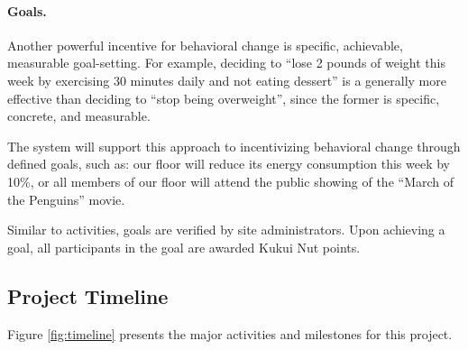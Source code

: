 \documentclass[11pt]{article}
\begin{document}
\paragraph{Goals.}  Another powerful incentive
for behavioral change is specific, achievable, measurable goal-setting.
For example, deciding to ``lose 2 pounds of weight this week by exercising
30 minutes daily and not eating dessert'' is a generally more effective
than deciding to ``stop being overweight'', since the former is specific,
concrete, and measurable.  

The system will support this approach to incentivizing behavioral change
through defined goals, such as: our floor will reduce its energy
consumption this week by 10\%, or all members of our floor will attend the
public showing of the ``March of the Penguins'' movie.  

Similar to activities, goals are verified by site administrators.  Upon
achieving a goal, all participants in the goal are awarded Kukui Nut
points.  


\subsection{Project Timeline}

Figure \ref{fig:timeline} presents the major activities and milestones for this project.
\end{document}
